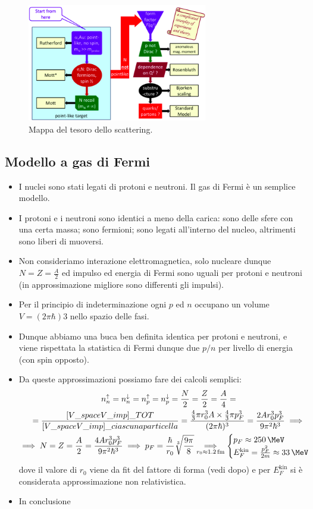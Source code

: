 \begin{figure}[H]
    \centering
    \includegraphics[width=0.7\textwidth]{immagini/fig_treasure_map_scattering}
    \caption{Mappa del tesoro dello scattering.}
\end{figure}
\subsection{Modello a gas di Fermi}
\begin{itemize}
    \item I nuclei sono stati legati di protoni e neutroni. Il gas di Fermi è un semplice modello.
    \item I protoni e i neutroni sono identici a meno della carica: sono delle sfere con una certa massa; sono fermioni; sono legati all'interno del nucleo, altrimenti sono liberi di muoversi. 
    \item Non consideriamo interazione elettromagnetica, solo nucleare dunque $N=Z=\frac A2$ ed impulso ed energia di Fermi sono uguali per protoni e neutroni (in approssimazione migliore sono differenti gli impulsi). 
    \item Per il principio di indeterminazione ogni $p$ ed $n$ occupano un volume $V=(2\pi\hbar)3$ nello spazio delle fasi.
    \item Dunque abbiamo una buca ben definita identica per protoni e neutroni, e viene rispettata la statistica di Fermi dunque due $p/n$ per livello di energia (con spin opposto).
    \item Da queste approssimazioni possiamo fare dei calcoli semplici:
    \begin{gather*}
    n_n^\uparrow=n_n^\downarrow=n_p^\uparrow=n_p^\downarrow=\frac N2=\frac Z2=\frac A4=\\
    =\frac{[V\_{space}V\_{imp}]\_{TOT}}{[V\_{space}V\_{imp}]\_{ciascuna particella}}=\frac{\frac43\pi r_0^3A\times\frac43\pi p_F^3}{(2\pi\hbar)^3}=\frac{2Ar_0^3p_F^3}{9\pi^2\hbar^3}\implies\\
    \implies N=Z=\frac A2=\frac{4Ar_0^3p_F^3}{9\pi^2\hbar^3}\implies p_F=\frac\hbar{r_0}\sqrt[3]{\frac{9\pi}8}\underset{r_0\approx1.2\,\text{fm}}{\implies}
    \begin{cases}
    p_F\approx250\,\MeV\\
    E_F^{\text{kin}}=\frac{p_F^2}{2m}\approx33\,\MeV
    \end{cases}
    \end{gather*}
    dove il valore di $r_0$ viene da fit del fattore di forma (vedi dopo) e per $E^{\text{kin}}_F$ si è considerata approssimazione non relativistica. 
    \item In conclusione
\end{itemize}